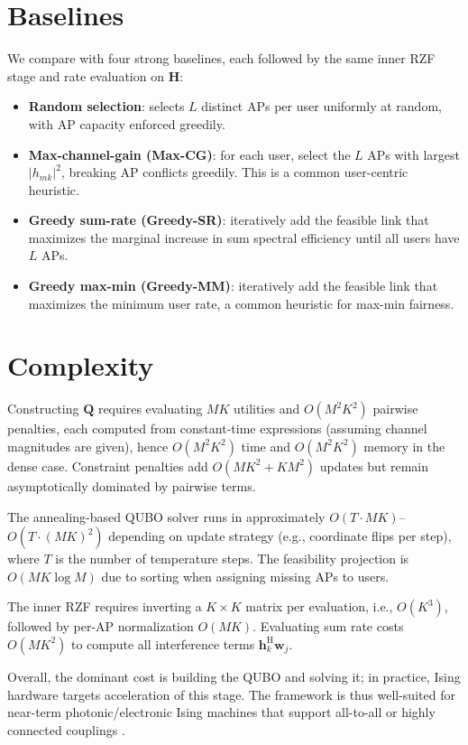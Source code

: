 \section{Baselines}
We compare with four strong baselines, each followed by the same inner RZF stage and rate evaluation on $\mathbf{H}$:
\begin{itemize}
\item \textbf{Random selection}: selects $L$ distinct APs per user uniformly at random, with AP capacity enforced greedily.
\item \textbf{Max-channel-gain (Max-CG)}: for each user, select the $L$ APs with largest $|h_{mk}|^2$, breaking AP conflicts greedily. This is a common user-centric heuristic.
\item \textbf{Greedy sum-rate (Greedy-SR)}: iteratively add the feasible link that maximizes the marginal increase in sum spectral efficiency until all users have $L$ APs.
\item \textbf{Greedy max-min (Greedy-MM)}: iteratively add the feasible link that maximizes the minimum user rate, a common heuristic for max-min fairness.
\end{itemize}

\section{Complexity}
Constructing $\mathbf{Q}$ requires evaluating $MK$ utilities and $O(M^2K^2)$ pairwise penalties, each computed from constant-time expressions (assuming channel magnitudes are given), hence $O(M^2K^2)$ time and $O(M^2K^2)$ memory in the dense case. Constraint penalties add $O(MK^2+KM^2)$ updates but remain asymptotically dominated by pairwise terms.

The annealing-based QUBO solver runs in approximately $O(T\cdot MK)$–$O(T\cdot (MK)^2)$ depending on update strategy (e.g., coordinate flips per step), where $T$ is the number of temperature steps. The feasibility projection is $O(MK\log M)$ due to sorting when assigning missing APs to users.

The inner RZF requires inverting a $K\times K$ matrix per evaluation, i.e., $O(K^3)$, followed by per-AP normalization $O(MK)$. Evaluating sum rate costs $O(MK^2)$ to compute all interference terms $\mathbf{h}_k^\mathrm{H}\mathbf{w}_j$.

Overall, the dominant cost is building the QUBO and solving it; in practice, Ising hardware targets acceleration of this stage. The framework is thus well-suited for near-term photonic/electronic Ising machines that support all-to-all or highly connected couplings \cite{mcmahon2016fully,inagaki2016coherent}.

